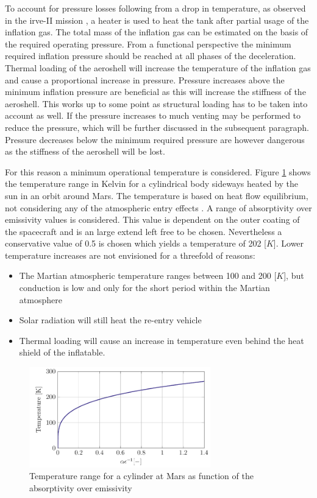 To account for pressure losses following from a drop in temperature, as observed in the \gls{irve}-II mission \cite{Dillman2012}, a heater is used to heat the tank after partial usage of the inflation gas. The total mass of the inflation gas can be estimated on the basis of the required operating pressure. From a functional perspective the minimum required inflation pressure should be reached at all phases of the deceleration. Thermal loading of the aeroshell will increase the temperature of the inflation gas and cause a proportional increase in pressure. Pressure increases above the minimum inflation pressure are beneficial as this will increase the stiffness of the aeroshell. This works up to some point as structural loading has to be taken into account as well. If the pressure increases to much venting may be performed to reduce the pressure, which will be further discussed in the subsequent paragraph. Pressure decreases below the minimum required pressure are however dangerous as the stiffness of the aeroshell will be lost.

For this reason a minimum operational temperature is considered. Figure \ref{fig:tanktemp} shows the temperature range in Kelvin for a cylindrical body sideways heated by the sun in an orbit around Mars. The temperature is based on heat flow equilibrium, not considering any of the atmospheric entry effects \cite{Wertz2011}. A range of absorptivity over emissivity values is considered. This value is dependent on the outer coating of the spacecraft and is an large extend left free to be chosen. Nevertheless a conservative value of 0.5 is chosen which yields a temperature of 202 [$K$]. Lower temperature increases are not envisioned for a threefold of reasons:

\begin{itemize}
\item The Martian atmospheric temperature ranges between 100 and 200 [$K$], but conduction is low and only for the short period within the Martian atmosphere
\item Solar radiation will still heat the re-entry vehicle
\item Thermal loading will cause an increase in temperature even behind the heat shield of the inflatable.
\end{itemize}

\begin{figure}[h]
		\centering
		\includegraphics[width=0.7\textwidth]{./Figure/Structure/Temp.pdf}
		\caption{Temperature range for a cylinder at Mars as function of the absorptivity over emissivity}
		\label{fig:tanktemp}
\end{figure}

